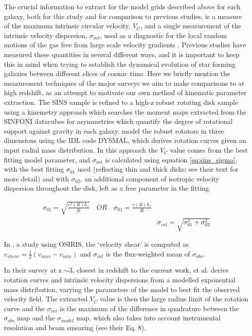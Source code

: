 \documentclass[fleqn,usenatbib]{mn2e}
\begin{document}
The crucial information to extract for the model grids described above for each galaxy, both for this study and for comparison to previous studies, is a measure of the maximum intrinsic circular velocity, $V_{C}$, and a single measurement of the intrinsic velocity dispersion, $\sigma_{int}$, used as a diagnostic for the local random motions of the gas free from large scale velocity gradients \citep[e.g.]{ForsterSchreiber2006,Genzel2008,Gnerucci2011}.
Previous studies have measured these quantities in several different ways, and it is important to keep this in mind when trying to establish the dynamical evolution of star forming galaxies between different slices of cosmic time.
Here we briefly mention the measurement techniques of the major surveys we aim to make comparisons to at high redshift, as an attempt to motivate our own method of kinematic parameter extraction.
The SINS sample \citep{ForsterSchreiber2009} is refined to a high-z robust rotating disk sample \citep{Cresci2009} using a kinemetry approach \citep{Krajnovic2006,Shapiro2008} which searches the moment maps extracted from the SINFONI datacubes for asymmetries which quantify the degree of rotational support against gravity in each galaxy.
\cite{Cresci2009} model the robust rotators in three dimensions using the IDL code DYSMAL, which derives rotation curves given an input radial mass distribution.
In this approach the $V_{C}$ value comes from the best fitting model parameter, and $\sigma_{int}$ is calculated using equation \ref{eq:sins_sigma}, with the best fitting $\sigma_{01}$ used (reflecting thin and thick disks; see their text for more detail) and with $\sigma_{02}$, an additional component of isotropic velocity dispersion throughout the disk, left as a free parameter in the fitting.

\begin{equation}\label{eq:sins_sigma}
\begin{split}
\sigma_{01} = \sqrt{\frac{v^{2}(R)h_{z}}{R}} \quad OR \quad \sigma_{01} = \frac{v(R)h_{z}}{R} \\
& \sigma_{int} = \sqrt{\sigma_{01}^{2} + \sigma_{02}^{2}}
\end{split}
\end{equation}

In \cite{Law2009}, a study using OSIRIS, the `velocity shear' is computed as $v_{shear} = \frac{1}{2}(v_{max} - v_{min})$ and $\sigma_{int}$ is the flux-weighted mean of $\sigma_{obs}$.

In their survey at z $\sim 3$, closest in redshift to the current work, \cite{Gnerucci2011} et al. derive rotation curves and intrinsic velocity dispersions from a modelled exponential mass distribution, varying the parameters of the model to best fit the observed velocity field.
The extracted $V_{C}$ value is then the large radius limit of the rotation curve and the $\sigma_{int}$ is the maximum of the difference in quadrature between the $\sigma_{obs}$ map and the $\sigma_{model}$ map, which also takes into account instrumental resolution and beam smearing (see their Eq. 8).
\end{document}
